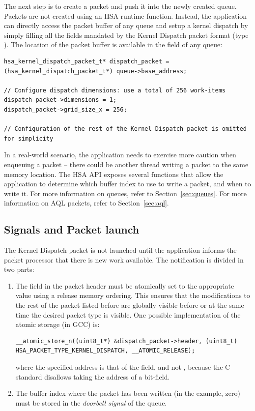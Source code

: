 \documentclass[final,oneside]{book}
\begin{document}
The next step is to create a packet and push it into the newly created
queue. Packets are not created using an HSA runtime function. Instead, the
application can directly access the packet buffer of any queue and setup a
kernel dispatch by simply filling all the fields mandated by the Kernel Dispatch
packet format (type ). The location of the
packet buffer is available in the  field of any
queue:
\begin{lstlisting}
hsa_kernel_dispatch_packet_t* dispatch_packet = (hsa_kernel_dispatch_packet_t*) queue->base_address;

// Configure dispatch dimensions: use a total of 256 work-items
dispatch_packet->dimensions = 1;
dispatch_packet->grid_size_x = 256;

// Configuration of the rest of the Kernel Dispatch packet is omitted for simplicity
\end{lstlisting}

In a real-world scenario, the application needs to exercise more caution when
enqueuing a packet -- there could be another thread writing a packet to the same
memory location. The HSA API exposes several functions that allow the
application to determine which buffer index to use to write a packet, and when to
write it. For more information on queues, refer to Section~\ref{sec:queues}. For
more information on AQL packets, refer to Section~\ref{sec:aql}.

\subsection{Signals and Packet launch}
The Kernel Dispatch packet is not launched until the application informs the
packet processor that there is new work available. The notification is divided
in two parts:

\begin{enumerate}
\item The  field in the packet header must be
  atomically set to the appropriate value using a release memory ordering. This
  ensures that the modifications to the rest of the packet listed before are
  globally visible before or at the same time the desired packet type is
  visible. One possible implementation of the atomic storage (in GCC) is:
\begin{lstlisting}
__atomic_store_n((uint8_t*) &dispatch_packet->header, (uint8_t) HSA_PACKET_TYPE_KERNEL_DISPATCH, __ATOMIC_RELEASE);
\end{lstlisting}
where the specified address is that of the
 field, and not
, because the C standard disallows taking the
address of a bit-field.
\item The buffer index where the packet has been written (in the example, zero)
must be stored in the \textit{doorbell signal} of the queue.
\end{enumerate}
\end{document}
